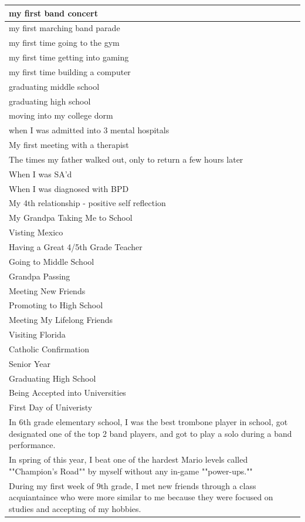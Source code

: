 \documentclass[
  .7em,
  letterpaper,
  DIV=11,
  numbers=noendperiod]{scrartcl}
\begin{document}
\begin{table}
\begin{tabular}{l}
\hline
my first band concert\\
\hline
my first marching band parade\\
\hline
my first time going to the gym\\
\hline
my first time getting into gaming\\
\hline
my first time building a computer\\
\hline
graduating middle school\\
\hline
graduating high school\\
\hline
moving into my college dorm\\
\hline
when I was admitted into 3 mental hospitals\\
\hline
My first meeting with a therapist\\
\hline
The times my father walked out, only to return a few hours later\\
\hline
When I was SA'd\\
\hline
When I was diagnosed with BPD\\
\hline
My 4th relationship - positive self reflection\\
\hline
My Grandpa Taking Me to School\\
\hline
Visting Mexico\\
\hline
Having a Great 4/5th Grade Teacher\\
\hline
Going to Middle School\\
\hline
Grandpa Passing\\
\hline
Meeting New Friends\\
\hline
Promoting to High School\\
\hline
Meeting My Lifelong Friends\\
\hline
Visiting Florida\\
\hline
Catholic Confirmation\\
\hline
Senior Year\\
\hline
Graduating High School\\
\hline
Being Accepted into Universities\\
\hline
First Day of Univeristy\\
\hline
In 6th grade elementary school, I was the best trombone player in school, got designated one of the top 2 band players, and got to play a solo during a band performance.\\
\hline
In spring of this year, I beat one of the hardest Mario levels called ""Champion's Road"" by myself without any in-game ""power-ups.""\\
\hline
During my first week of 9th grade, I met new friends through a class acquiantaince who were more similar to me because they were focused on studies and accepting of my hobbies.\\

\end{tabular}
\end{table}
\end{document}
